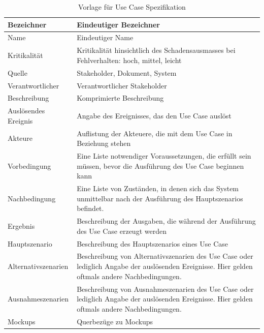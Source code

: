 \begin{table}[ht]
\centering
  \begin{tabular}{ l | p{10cm} }
	\hline
	\rowcolor{gray}
	Bezeichner		&	Eindeutiger Bezeichner\\ \hline
	Name			&	Eindeutiger Name\\ \hline
	Kritikalität		&	Kritikalität hinsichtlich des Schadensausmasses bei Fehlverhalten: hoch, mittel, leicht\\ \hline
	Quelle			&	Stakeholder, Dokument, System\\ \hline
	Verantwortlicher	&	Verantwortlicher Stakeholder\\ \hline
	Beschreibung	&	Komprimierte Beschreibung\\ \hline
	Auslösendes Ereignis&	Angabe des Ereignisses, das den Use Case auslöst\\ \hline
	Akteure		&	Auflistung der Akteuere, die mit dem Use Case in Beziehung stehen\\ \hline
	Vorbedingung	&	Eine Liste notwendiger Voraussetzungen, die erfüllt sein müssen, bevor die Ausführung des Use Case beginnen kann\\ \hline
	Nachbedingung	&	Eine Liste von Zuständen, in denen sich das System unmittelbar nach der Ausführung des Hauptszenarios befindet.\\ \hline
	Ergebnis		&	Beschreibung der Ausgaben, die während der Ausführung des Use Case erzeugt werden\\ \hline
	Hauptszenario	&	Beschreibung des Hauptszenarios eines Use Case\\ \hline
	Alternativszenarien	&	Beschreibung von Alternativszenarien des Use Case oder lediglich Angabe der auslösenden Ereignisse. 
					Hier gelden oftmals andere Nachbedingungen.\\ \hline
	Ausnahmeszenarien&	Beschreibung von Ausnahmeszenarien des Use Case oder lediglich Angabe der auslösenden Ereignisse. 
					Hier gelden oftmals andere Nachbedingungen.\\ \hline
	Mockups	 	&	Querbezüge zu Mockups
  \end{tabular}
   \caption{Vorlage für Use Case Spezifikation}\label{table:use_case_template}
\end{table}

